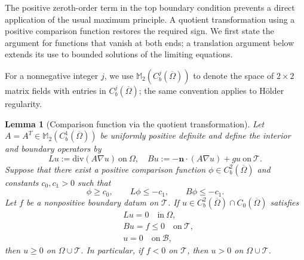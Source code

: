 \documentclass[12pt,letterpaper]{amsart}
\newtheorem{lemma}[theorem]{Lemma}
\numberwithin{equation}{section}
\begin{document}
	
	{The positive zeroth-order term in the top boundary condition prevents a direct application of the usual maximum principle. A quotient transformation using a positive comparison function restores the required sign. We first state the argument for functions that vanish at both ends; a translation argument below extends its use to bounded solutions of the limiting equations.}
	
	
	{For a nonnegative integer $j$, we use $\mathbb M_2(C_b^j(\overline\Omega))$ to denote the space of $2\times2$ matrix fields with entries in $C_b^j(\overline\Omega)$; the same convention applies to H\"older regularity.}

\begin{lemma}[Comparison function via the quotient transformation]\label{lem:comparison-function}
		Let $A=A^T \in \mathbb  M_2(C_b^1(\overline{\Omega}))$ be uniformly positive definite and {define the interior and boundary operators by}
		\begin{equation*}
		Lu:=\mathrm{div}(A\nabla u)\mathrm{~on~}\Omega,\quad Bu:=-{\mathbf n\cdot}(A\nabla u)+gu\mathrm{~on~}\mathcal T.
		\end{equation*}
		{Suppose that there exist a positive comparison function $\phi\in C_b^2(\overline\Omega)$ and constants $c_0,c_1>0$ such that}
		\begin{equation*}
			\phi\ge c_0,\qquad L\phi\le-c_1,
			\qquad B\phi\le-c_1.
		\end{equation*}
		{Let $f$ be a nonpositive boundary datum on $\mathcal T$. If $u\in C_b^2(\overline\Omega)\cap C_0(\overline\Omega)$ satisfies}
		\begin{equation*}
			\begin{aligned}
				&Lu=0\quad\mathrm{in~}\Omega,\\
				&Bu=f\leq0 \quad\mathrm{on~}\mathcal T,\\
				&u=0\quad\mathrm{on~}\mathcal B,
			\end{aligned}
		\end{equation*}
		then $u\geq0$ on $\Omega\cup \mathcal{T}$. In particular, if $f<0$ on $\mathcal{T}$, then $u>0$ on $\Omega\cup \mathcal{T}$.
 	\end{lemma}
\end{document}
